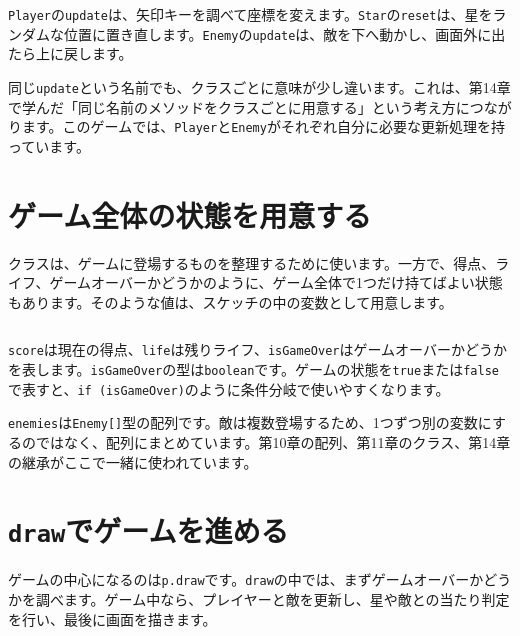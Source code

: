 \begin{listing}[htbp]
\inputminted[firstline=87,lastline=116]{ts}{typescript-p5/listings/chapter15/star-catcher-game.ts}
\caption{上から落ちてくる\texttt{Enemy}（\texttt{chapter15/star-catcher-game.ts}）}
\label{lst:chapter15-enemy-class}
\end{listing}

\texttt{Player}の\texttt{update}は、矢印キーを調べて座標を変えます。\texttt{Star}の\texttt{reset}は、星をランダムな位置に置き直します。\texttt{Enemy}の\texttt{update}は、敵を下へ動かし、画面外に出たら上に戻します。

同じ\texttt{update}という名前でも、クラスごとに意味が少し違います。これは、第14章で学んだ「同じ名前のメソッドをクラスごとに用意する」という考え方につながります。このゲームでは、\texttt{Player}と\texttt{Enemy}がそれぞれ自分に必要な更新処理を持っています。

\section{ゲーム全体の状態を用意する}

クラスは、ゲームに登場するものを整理するために使います。一方で、得点、ライフ、ゲームオーバーかどうかのように、ゲーム全体で1つだけ持てばよい状態もあります。そのような値は、スケッチの中の変数として用意します。

\begin{listing}[htbp]
\inputminted[firstline=119,lastline=145]{ts}{typescript-p5/listings/chapter15/star-catcher-game.ts}
\caption{ゲーム全体の状態を用意する（\texttt{chapter15/star-catcher-game.ts}）}
\label{lst:chapter15-game-state}
\end{listing}

\texttt{score}は現在の得点、\texttt{life}は残りライフ、\texttt{isGameOver}はゲームオーバーかどうかを表します。\texttt{isGameOver}の型は\texttt{boolean}です。ゲームの状態を\texttt{true}または\texttt{false}で表すと、\texttt{if (isGameOver)}のように条件分岐で使いやすくなります。

\texttt{enemies}は\texttt{Enemy[]}型の配列です。敵は複数登場するため、1つずつ別の変数にするのではなく、配列にまとめています。第10章の配列、第11章のクラス、第14章の継承がここで一緒に使われています。

\section{\texttt{draw}でゲームを進める}

ゲームの中心になるのは\texttt{p.draw}です。\texttt{draw}の中では、まずゲームオーバーかどうかを調べます。ゲーム中なら、プレイヤーと敵を更新し、星や敵との当たり判定を行い、最後に画面を描きます。


